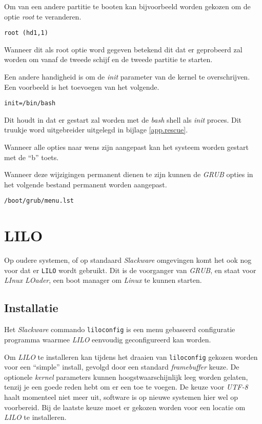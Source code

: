 Om van een andere partitie te booten kan bijvoorbeeld worden gekozen om de optie \emph{root} te veranderen. 
\begin{lstlisting}
root (hd1,1)
\end{lstlisting}
Wanneer dit als root optie word gegeven betekend dit dat er geprobeerd zal worden om vanaf de tweede schijf en de tweede partitie te starten. 

Een andere handigheid is om de \emph{init} parameter van de kernel te overschrijven. Een voorbeeld is het toevoegen van het volgende. 
\begin{lstlisting}
init=/bin/bash
\end{lstlisting}
Dit houdt in dat er gestart zal worden met de \emph{bash} shell als \emph{init} proces. Dit truukje word uitgebreider uitgelegd in bijlage \ref{app.rescue}. 

Wanneer alle opties naar wens zijn aangepast kan het systeem worden gestart met de ``b'' toets. 

Wanneer deze wijzigingen permanent dienen te zijn kunnen de \emph{GRUB} opties in het volgende bestand permanent worden aangepast.
\begin{lstlisting}
/boot/grub/menu.lst
\end{lstlisting}

\section{LILO}
Op oudere systemen, of op standaard \emph{Slackware} omgevingen komt het ook nog voor dat er \texttt{LILO} wordt gebruikt. Dit is de voorganger van \emph{GRUB}, en staat voor \emph{LInux LOader}, een boot manager om \emph{Linux} te kunnen starten. 

\subsection{Installatie}
Het \emph{Slackware} commando \texttt{liloconfig} is een menu gebaseerd configuratie programma waarmee \emph{LILO} eenvoudig geconfigureerd kan worden. 

Om \emph{LILO} te installeren kan tijdens het draaien van \texttt{liloconfig} gekozen worden voor een ``simple'' install, gevolgd door een standard \emph{framebuffer} keuze. De optionele \emph{kernel} parameters kunnen hoogstwaarschijnlijk leeg worden gelaten, tenzij je een goede reden hebt om er een toe te voegen. De keuze voor \emph{UTF-8} haalt momenteel niet meer uit, software is op nieuwe systemen hier wel op voorbereid. Bij de laatste keuze moet er gekozen worden voor een locatie om \emph{LILO} te installeren. 

